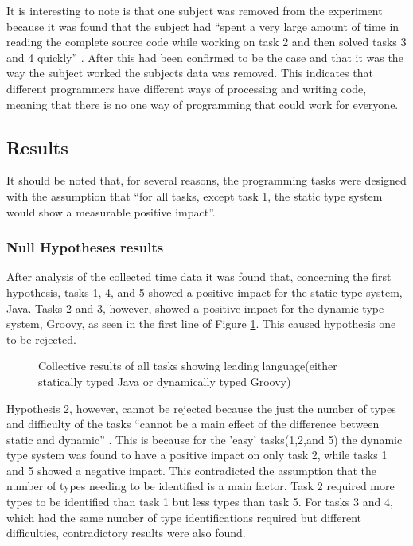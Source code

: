 \documentclass{sig-alternate}
\begin{document}
It is interesting to note is that one subject was removed from the experiment because it was found that the subject had ``spent a very large amount of time in reading the complete source code while working on task 2 and then solved tasks 3 and 4 quickly'' \cite{Mayer2012}. After this had been confirmed to be the case and that it was the way the subject worked the subjects data was removed. This indicates that different programmers have different ways of processing and writing code, meaning that there is no one way of programming that could work for everyone. 

\subsection{Results}
It should be noted that, for several reasons, the programming tasks were designed with the assumption that ``for all tasks, except task 1, the static type system would show a measurable positive impact''\cite{Mayer2012}.

\subsubsection{Null Hypotheses results}
After analysis of the collected time data it was found that, concerning the first hypothesis, tasks 1, 4, and 5 showed a positive impact for the static type system, Java. Tasks 2 and 3, however, showed a positive impact for the dynamic type system, Groovy, as seen in the first line of Figure \ref{influenceResults}. This caused hypothesis one to be rejected.
\begin{figure}
\centering
{}
\caption{Collective results of all tasks showing leading language(either statically typed Java or dynamically typed Groovy)\cite{Mayer2012}}
\label{influenceResults}
\end{figure}

Hypothesis 2, however, cannot be rejected because the just the number of types and difficulty of the tasks ``cannot be a main effect of the difference between static and dynamic'' \cite{Mayer2012}. This is because for the 'easy' tasks(1,2,and 5) the dynamic type system was found to have a positive impact on only task 2, while tasks 1 and 5 showed a negative impact. This contradicted the assumption that the number of types needing to be identified is a main factor. Task 2 required more types to be identified than task 1 but less types than task 5. For tasks 3 and 4, which had the same number of type identifications required but different difficulties, contradictory results were also found.
\end{document}
